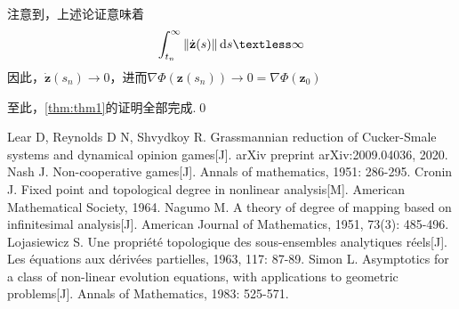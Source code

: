 \documentclass[11pt,a4paper]{article}
\newcommand*{\dif}{\mathop{}\!\mathrm{d}}%
\theoremstyle{definition}
\begin{document}
	注意到，上述论证意味着\[ \int_{t_{n}}^{\infty}\Vert\dot{\textbf{z}}(s)\Vert\dif s\textless\infty\]因此，$\dot{\textbf{z}}(s_{n})\rightarrow0$，进而$\nabla\Phi(\textbf{z}(s_{n}))\rightarrow0=\nabla\Phi(\textbf{z}_{0})$
	
	至此，\eqref{thm:thm1}的证明全部完成.\qed
\begin{thebibliography}{99}  
	
	Lear D, Reynolds D N, Shvydkoy R. Grassmannian reduction of Cucker-Smale systems and dynamical opinion games[J]. arXiv preprint arXiv:2009.04036, 2020.
	Nash J. Non-cooperative games[J]. Annals of mathematics, 1951: 286-295.
	Cronin J. Fixed point and topological degree in nonlinear analysis[M]. American Mathematical Society, 1964.
	Nagumo M. A theory of degree of mapping based on infinitesimal analysis[J]. American Journal of Mathematics, 1951, 73(3): 485-496.
	Lojasiewicz S. Une propriété topologique des sous-ensembles analytiques réels[J]. Les équations aux dérivées partielles, 1963, 117: 87-89.
	Simon L. Asymptotics for a class of non-linear evolution equations, with applications to geometric problems[J]. Annals of Mathematics, 1983: 525-571.
	
\end{thebibliography}
\end{document}
